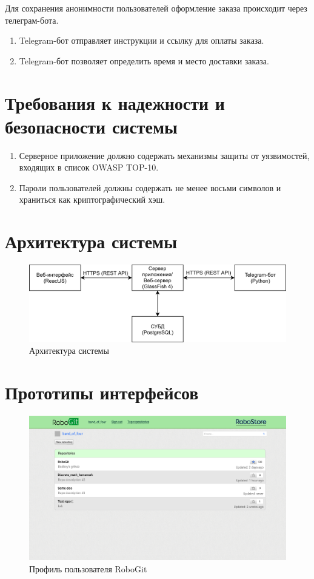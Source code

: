 \documentclass[12pt, a4paper]{article}
\begin{document}
Для сохранения анонимности пользователей оформление заказа происходит
через телеграм-бота.

\begin{enumerate}
\item Telegram-бот отправляет инструкции и ссылку для оплаты заказа.
\item Telegram-бот позволяет определить время и место доставки заказа.
\end{enumerate}

\section{Требования к надежности и безопасности системы}

\begin{enumerate}
\item Серверное приложение должно содержать механизмы защиты от
  уязвимостей, входящих в список OWASP TOP-10.
\item Пароли пользователей должны содержать не менее восьми 
  символов и храниться как криптографический хэш.
\end{enumerate}

\section{Архитектура системы}

\begin{figure}[H]
  \centering
  \includegraphics[width=16cm]{system-arch.png}
  \caption{Архитектура системы}
\end{figure}

\section{Прототипы интерфейсов}

\begin{figure}[H]
  \centering
  \includegraphics[width=16cm]{png/git_profile.png}
  \caption{Профиль пользователя RoboGit}
\end{figure}
\end{document}
